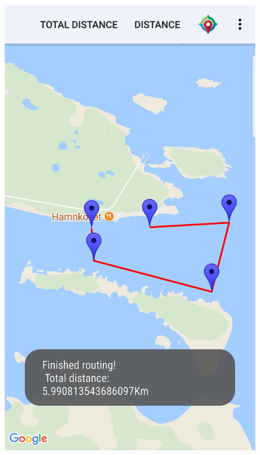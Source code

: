 \begin{figure}[H]
\begin{minipage}[c]{0.35\textwidth}
	\includegraphics[width=\textwidth]{Figures/map.png}
	\label{feedback-map}
	\end{minipage}
\end{figure}
